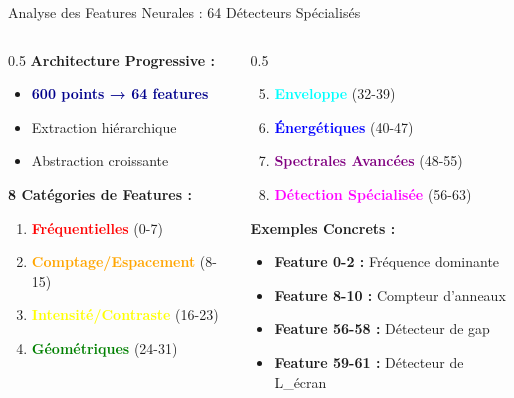 \documentclass[aspectratio=169]{beamer}
\begin{document}
\begin{frame}{Analyse des Features Neurales : 64 Détecteurs Spécialisés}
    \begin{columns}
        \begin{column}{0.5\textwidth}
            \textbf{Architecture Progressive :}
            \begin{itemize}
                \item \textcolor{darkblue}{\textbf{600 points → 64 features}}
                \item Extraction hiérarchique
                \item Abstraction croissante
            \end{itemize}

            \vspace{0.3cm}
            \textbf{8 Catégories de Features :}
            \begin{enumerate}
                \item \textcolor{red}{\textbf{Fréquentielles}} (0-7)
                \item \textcolor{orange}{\textbf{Comptage/Espacement}} (8-15)
                \item \textcolor{yellow}{\textbf{Intensité/Contraste}} (16-23)
                \item \textcolor{green}{\textbf{Géométriques}} (24-31)
            \end{enumerate}
        \end{column}
        \begin{column}{0.5\textwidth}
            \begin{enumerate}
                \setcounter{enumi}{4}
                \item \textcolor{cyan}{\textbf{Enveloppe}} (32-39)
                \item \textcolor{blue}{\textbf{Énergétiques}} (40-47)
                \item \textcolor{purple}{\textbf{Spectrales Avancées}} (48-55)
                \item \textcolor{magenta}{\textbf{Détection Spécialisée}} (56-63)
            \end{enumerate}

            \vspace{0.3cm}
            \textbf{Exemples Concrets :}
            \begin{itemize}
                \item \textbf{Feature 0-2 :} Fréquence dominante
                \item \textbf{Feature 8-10 :} Compteur d'anneaux
                \item \textbf{Feature 56-58 :} Détecteur de gap
                \item \textbf{Feature 59-61 :} Détecteur de L\_écran
            \end{itemize}
        \end{column}
    \end{columns}
\end{frame}
\end{document}
